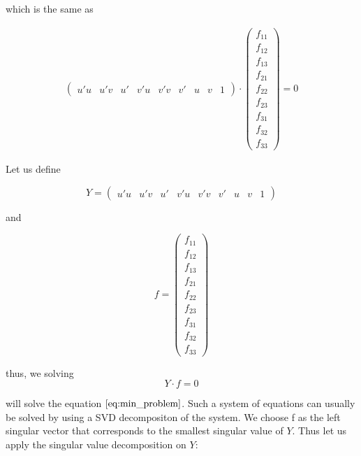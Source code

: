 \documentclass{paper}
\begin{document}
which is the same as

\begin{align*}
\left(\begin{array}{ccccccccc}
u' u & u' v & u' & v' u & v' v & v' & u & v & 1
\end{array}
\right)
\cdot
\left(\begin{array}{c}
f_{11} \\
f_{12} \\
f_{13} \\
f_{21} \\
f_{22} \\
f_{23} \\
f_{31} \\
f_{32} \\
f_{33}
\end{array}
\right)
= 0
\end{align*}

Let us define 

\begin{equation}
Y = 
\left(\begin{array}{ccccccccc}
u' u & u' v & u' & v' u & v' v & v' & u & v & 1
\end{array}
\right)
\end{equation}



and 

\begin{equation}
    f = \left(\begin{array}{c}
f_{11} \\
f_{12} \\
f_{13} \\
f_{21} \\
f_{22} \\
f_{23} \\
f_{31} \\
f_{32} \\
f_{33}
\end{array}
\right)
\end{equation}

thus, we solving 
\begin{equation}
 Y \cdot f = 0
\end{equation}

will solve the equation $\ref{eq:min_problem}$. Such a system of equations can usually be solved by using a SVD decompositon of the system. We choose f as the left singular vector that corresponds to the smallest singular value of $Y$. Thus let us apply the singular value decomposition on $Y$:
\end{document}
